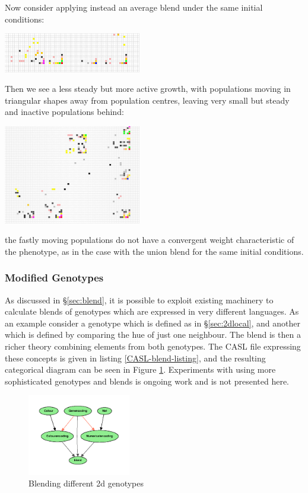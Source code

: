 \documentclass{AISB2008}
\begin{document}
Now consider applying instead an average blend under the same initial conditions:
 \begin{center}
 \includegraphics[width=0.45\textwidth]{init2_average.jpg}
 \end{center}
Then we see a less steady but more active growth, with populations moving in triangular shapes away from population centres, leaving very small but steady and inactive populations behind:
 \begin{center}
 \includegraphics[width=0.45\textwidth]{init2daverage++.jpg}
 \end{center}
\noindent the fastly moving populations do not have a convergent weight characteristic of the phenotype, as in the case with the union blend for the same initial conditions. 



\subsubsection{Modified Genotypes} \label{sec:mgeno}

As discussed in \S\ref{sec:blend}, it is possible to exploit existing
machinery to calculate blends of genotypes which are expressed in very
different languages. As an example consider a genotype which is
defined as in \S\ref{sec:2dlocal}, and another which is defined by
comparing the hue of just one neighbour. The blend is then a richer
theory combining elements from both genotypes. The CASL file
expressing these concepts is given in listing
\ref{CASL-blend-listing}, and the resulting categorical diagram can be
seen in Figure \ref{fig:2dblend}. Experiments with using more sophisticated
genotypes and blends is ongoing work and is not presented here. 
\begin{figure}[!ht]
\includegraphics[width=0.4\textwidth]{2dblend.pdf}
\caption{Blending different 2d genotypes}
\label{fig:2dblend}
\end{figure}
\end{document}
